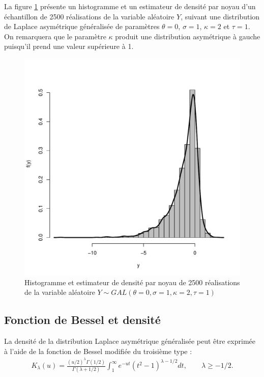 La figure \ref{fig:simulGAL} présente un histogramme et un estimateur
de densité par noyau d'un échantillon de 2500 réalisations de la
variable aléatoire $Y$, suivant une distribution de Laplace
asymétrique généralisée de paramètres $\theta=0$, $\sigma=1$,
$\kappa=2$ et $\tau=1$. On remarquera que le paramètre $\kappa$
produit une distribution asymétrique à gauche puisqu'il prend une
valeur supérieure à 1.

\begin{figure}[!ht]
  \centering
  \includegraphics[scale=0.8]{"../graphiques/CH3-SIMULGAL0121"}
  \caption{Histogramme et estimateur de densité par noyau de 2500
    réalisations de la variable aléatoire $Y\sim
    GAL(\theta=0,\sigma=1,\kappa=2,\tau=1)$}
  \label{fig:simulGAL}
\end{figure}

\subsection{Fonction de Bessel et densité}
\label{sec:besseldensiteGAL}

La densité de la distribution Laplace asymétrique généralisée peut
être exprimée à l'aide de la fonction de Bessel modifiée du troisième
type \citep{abramowitz1965handbook}:
\begin{align}
  \label{eq:BesselK}
  K_{\lambda}(u) =
  \frac{(u/2)^{\lambda}\Gamma(1/2)}{\Gamma(\lambda+1/2)}
  \int_1^{\infty} e^{-ut} (t^2-1)^{\lambda-1/2}dt,\qquad \lambda \geq
  -1/2.
\end{align}

